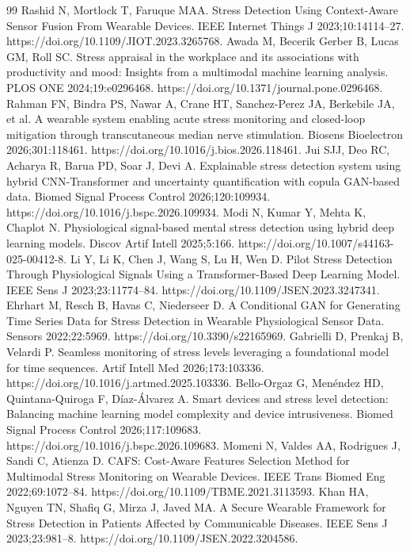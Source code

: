 \begin{thebibliography}{99}
 Rashid N, Mortlock T, Faruque MAA. Stress Detection Using Context-Aware Sensor Fusion From Wearable Devices. IEEE Internet Things J 2023;10:14114--27. https://doi.org/10.1109/JIOT.2023.3265768.
 Awada M, Becerik Gerber B, Lucas GM, Roll SC. Stress appraisal in the workplace and its associations with productivity and mood: Insights from a multimodal machine learning analysis. PLOS ONE 2024;19:e0296468. https://doi.org/10.1371/journal.pone.0296468.
 Rahman FN, Bindra PS, Nawar A, Crane HT, Sanchez-Perez JA, Berkebile JA, et al. A wearable system enabling acute stress monitoring and closed-loop mitigation through transcutaneous median nerve stimulation. Biosens Bioelectron 2026;301:118461. https://doi.org/10.1016/j.bios.2026.118461.
 Jui SJJ, Deo RC, Acharya R, Barua PD, Soar J, Devi A. Explainable stress detection system using hybrid CNN-Transformer and uncertainty quantification with copula GAN-based data. Biomed Signal Process Control 2026;120:109934. https://doi.org/10.1016/j.bspc.2026.109934.
 Modi N, Kumar Y, Mehta K, Chaplot N. Physiological signal-based mental stress detection using hybrid deep learning models. Discov Artif Intell 2025;5:166. https://doi.org/10.1007/s44163-025-00412-8.
 Li Y, Li K, Chen J, Wang S, Lu H, Wen D. Pilot Stress Detection Through Physiological Signals Using a Transformer-Based Deep Learning Model. IEEE Sens J 2023;23:11774--84. https://doi.org/10.1109/JSEN.2023.3247341.
 Ehrhart M, Resch B, Havas C, Niederseer D. A Conditional GAN for Generating Time Series Data for Stress Detection in Wearable Physiological Sensor Data. Sensors 2022;22:5969. https://doi.org/10.3390/s22165969.
 Gabrielli D, Prenkaj B, Velardi P. Seamless monitoring of stress levels leveraging a foundational model for time sequences. Artif Intell Med 2026;173:103336. https://doi.org/10.1016/j.artmed.2025.103336.
 Bello-Orgaz G, Menéndez HD, Quintana-Quiroga F, Díaz-Álvarez A. Smart devices and stress level detection: Balancing machine learning model complexity and device intrusiveness. Biomed Signal Process Control 2026;117:109683. https://doi.org/10.1016/j.bspc.2026.109683.
 Momeni N, Valdes AA, Rodrigues J, Sandi C, Atienza D. CAFS: Cost-Aware Features Selection Method for Multimodal Stress Monitoring on Wearable Devices. IEEE Trans Biomed Eng 2022;69:1072--84. https://doi.org/10.1109/TBME.2021.3113593.
 Khan HA, Nguyen TN, Shafiq G, Mirza J, Javed MA. A Secure Wearable Framework for Stress Detection in Patients Affected by Communicable Diseases. IEEE Sens J 2023;23:981--8. https://doi.org/10.1109/JSEN.2022.3204586.

\end{thebibliography}
